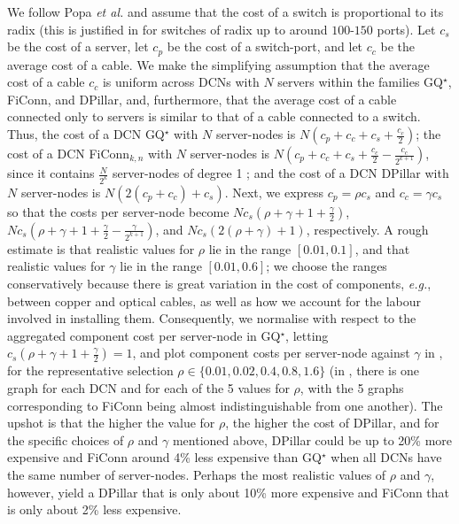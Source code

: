 \documentclass[]{amsart}
\newcommand\set[1]{\{#1\}}
\begin{document}
We follow Popa \emph{et al.} \cite{PopaRatnasamyIannaccone2010} and assume that the cost of a switch is proportional to its radix (this is justified in \cite{PopaRatnasamyIannaccone2010} for switches of radix up to around $100$-$150$ ports). Let $c_s$ be the cost of a server, let $c_p$ be the cost of a switch-port, and let $c_c$ be the average cost of a cable.  We make the simplifying assumption that the average cost of a cable $c_c$ is uniform across DCNs with $N$ servers within the families GQ$^\star$, FiConn, and DPillar, and, furthermore, that the average cost of a cable connected only to servers is similar to that of a cable connected to a switch.  Thus, the cost of a DCN GQ$^\star$ with $N$ server-nodes is $N(c_p+c_c+c_s+\frac{c_c}{2})$; the cost of a DCN FiConn$_{k,n}$ with $N$ server-nodes is
$N(c_p+c_c+c_s+\frac{c_c}{2}-\frac{c_c}{2^{k+1}})$, since it contains $\frac{N}{2^k}$ server-nodes of degree 1 \cite{LiGuoWu2011}; and the cost of a DCN DPillar with $N$ server-nodes is $N(2(c_p+c_c)+c_s)$.  Next, we express $c_p=\rho c_s$ and $c_c=\gamma c_s$  so that the costs per server-node become $Nc_s(\rho+\gamma + 1 + \frac{\gamma}{2})$,
$Nc_s(\rho+\gamma+1+\frac{\gamma}{2}-\frac{\gamma}{2^{k+1}})$, and
$Nc_s(2(\rho+\gamma) + 1)$, respectively. A rough estimate is that realistic values for $\rho$ lie in the range $[0.01,0.1]$, and that realistic values for $\gamma$ lie in the range $[0.01,0.6]$; we choose the ranges conservatively because there is great variation in the cost of components, \emph{e.g.}, between copper and optical cables, as well as how we account for the labour involved in installing them.  Consequently, we normalise with respect to the aggregated component cost per server-node in GQ$^\star$, letting $c_s(\rho +\gamma + 1 + \frac{\gamma}{2})=1$, and plot component costs per server-node against $\gamma$ in , for the representative selection $\rho\in\set{0.01,0.02,0.4,0.8,1.6}$ (in , there is one graph for each DCN and for each of the 5 values for $\rho$, with the 5 graphs corresponding to FiConn being almost indistinguishable from one another).  The upshot is that the higher the value for $\rho$, the higher the cost of DPillar, and for the specific choices of $\rho$ and $\gamma$ mentioned above, DPillar could be up to 20\% more expensive and FiConn around 4\% less expensive than GQ$^\star$ when all DCNs have the same number of server-nodes. Perhaps the most realistic values of $\rho$ and $\gamma$, however, yield a DPillar that is only about 10\% more expensive and FiConn that is only about 2\% less expensive.
\end{document}

